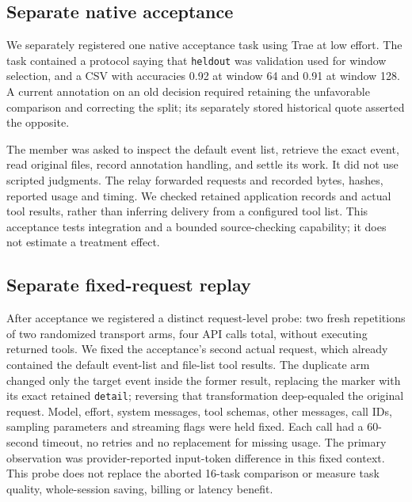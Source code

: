 \documentclass[11pt,a4paper]{article}
\begin{document}
\subsection{Separate native acceptance}
We separately registered one native acceptance task using Trae at low effort. The task contained a protocol saying that \texttt{heldout} was validation used for window selection, and a CSV with accuracies 0.92 at window 64 and 0.91 at window 128. A current annotation on an old decision required retaining the unfavorable comparison and correcting the split; its separately stored historical quote asserted the opposite.

The member was asked to inspect the default event list, retrieve the exact event, read original files, record annotation handling, and settle its work. It did not use scripted judgments. The relay forwarded requests and recorded bytes, hashes, reported usage and timing. We checked retained application records and actual tool results, rather than inferring delivery from a configured tool list. This acceptance tests integration and a bounded source-checking capability; it does not estimate a treatment effect.

\subsection{Separate fixed-request replay}
After acceptance we registered a distinct request-level probe: two fresh repetitions of two randomized transport arms, four API calls total, without executing returned tools. We fixed the acceptance's second actual request, which already contained the default event-list and file-list tool results. The duplicate arm changed only the target event inside the former result, replacing the marker with its exact retained \texttt{detail}; reversing that transformation deep-equaled the original request. Model, effort, system messages, tool schemas, other messages, call IDs, sampling parameters and streaming flags were held fixed. Each call had a 60-second timeout, no retries and no replacement for missing usage. The primary observation was provider-reported input-token difference in this fixed context. This probe does not replace the aborted 16-task comparison or measure task quality, whole-session saving, billing or latency benefit.
\end{document}
